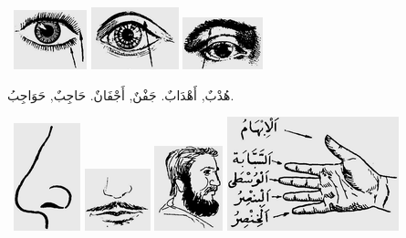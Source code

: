 \documentclass[a5paper]{article}
\begin{document}
\  \includegraphics[width=0.8335in,height=0.6772in]{MuhammadBagauddinlatinized-img259.png}   \includegraphics[width=1in,height=0.7083in]{MuhammadBagauddinlatinized-img260.png}   \includegraphics[width=0.9165in,height=0.5937in]{MuhammadBagauddinlatinized-img261.png} 

هُدْبٌ, أَهْدَابٌ. جَفْنٌ, أَجْفَانٌ. حَاجِبٌ, حَوَاجِبُ.

\  \includegraphics[width=0.7602in,height=1.2291in]{MuhammadBagauddinlatinized-img262.png}   \includegraphics[width=0.75in,height=0.7083in]{MuhammadBagauddinlatinized-img263.png}   \includegraphics[width=0.7811in,height=0.9689in]{MuhammadBagauddinlatinized-img264.png}   \includegraphics[width=1.9583in,height=1.302in]{MuhammadBagauddinlatinized-img265.png} 
\end{document}
